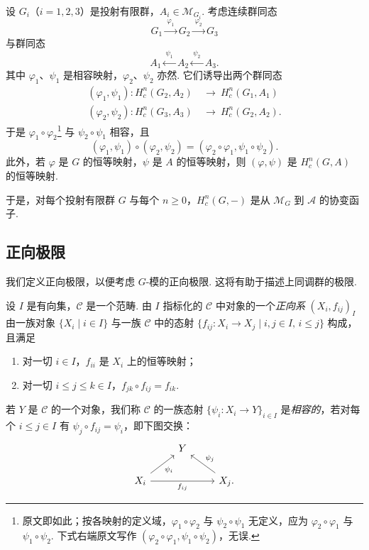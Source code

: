 设 $G_i$（$i=1,2,3$）是投射有限群，$A_i\in\mathscr{M}_{G_i}$. 考虑连续群同态
\[
G_1\xrightarrow{\ \varphi_1\ }G_2\xrightarrow{\ \varphi_2\ }G_3
\]
与群同态
\[
A_1\xleftarrow{\ \psi_1\ }A_2\xleftarrow{\ \psi_2\ }A_3.
\]
其中 $\varphi_1$、$\psi_1$ 是相容映射，$\varphi_2$、$\psi_2$ 亦然. 它们诱导出两个群同态
\[
\begin{aligned}
(\varphi_1,\psi_1):H^n_c(G_2,A_2)\ &\to\ H^n_c(G_1,A_1)\\
(\varphi_2,\psi_2):H^n_c(G_3,A_3)\ &\to\ H^n_c(G_2,A_2).
\end{aligned}
\]
于是 $\varphi_1\circ\varphi_2$\footnote{原文即如此；按各映射的定义域，$\varphi_1\circ\varphi_2$ 与 $\psi_2\circ\psi_1$ 无定义，应为 $\varphi_2\circ\varphi_1$ 与 $\psi_1\circ\psi_2$. 下式右端原文写作 $(\varphi_2\circ\varphi_1,\psi_1\circ\psi_2)$，无误.} 与 $\psi_2\circ\psi_1$ 相容，且
\[
(\varphi_1,\psi_1)\circ(\varphi_2,\psi_2)=(\varphi_2\circ\varphi_1,\psi_1\circ\psi_2).
\]
此外，若 $\varphi$ 是 $G$ 的恒等映射，$\psi$ 是 $A$ 的恒等映射，则 $(\varphi,\psi)$ 是 $H^n_c(G,A)$ 的恒等映射.

于是，对每个投射有限群 $G$ 与每个 $n\geq 0$，$H^n_c(G,-)$ 是从 $\mathscr{M}_G$ 到 $\mathscr{A}$ 的协变函子.

\subsection{正向极限}
\label{c5-sub-3-2}

我们定义正向极限，以便考虑 $G$-模的正向极限. 这将有助于描述上同调群的极限.

\begin{definition}\label{c5-def-3-3}
设 $I$ 是有向集，$\mathscr{C}$ 是一个范畴. 由 $I$ 指标化的 $\mathscr{C}$ 中对象的一个\emph{正向系} $(X_i,f_{ij})_I$ 由一族对象 $\{X_i\mid i\in I\}$ 与一族 $\mathscr{C}$ 中的态射 $\{f_{ij}:X_i\to X_j\mid i,j\in I,\,i\leq j\}$ 构成，且满足
\begin{enumerate}[label=(\arabic*),leftmargin=*]
    \item 对一切 $i\in I$，$f_{ii}$ 是 $X_i$ 上的恒等映射；
    \item 对一切 $i\leq j\leq k\in I$，$f_{jk}\circ f_{ij}=f_{ik}$.
\end{enumerate}
\end{definition}

\begin{definition}\label{c5-def-3-4}
若 $Y$ 是 $\mathscr{C}$ 的一个对象，我们称 $\mathscr{C}$ 的一族态射 $\{\psi_i:X_i\to Y\}_{i\in I}$ 是\emph{相容的}，若对每个 $i\leq j\in I$ 有 $\psi_j\circ f_{ij}=\psi_i$，即下图交换：
\[
\begin{tikzcd}
& Y & \\
X_i \arrow[ur,"\psi_i"'] \arrow[rr,"f_{ij}"'] & & X_j. \arrow[ul,"\psi_j"']
\end{tikzcd}
\]
\end{definition}

